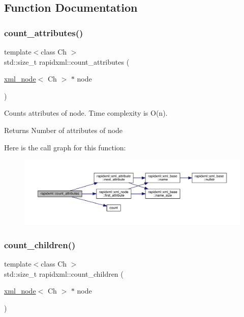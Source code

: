 \subsection{Function Documentation}
\mbox{\label{namespacerapidxml_a6255d15e5d8ad12ebcd7c60da51c97e2}} 
\subsubsection{\texorpdfstring{count\_attributes()}{count\_attributes()}}
{\footnotesize\ttfamily template$<$class Ch $>$ \\
std\+::size\+\_\+t rapidxml\+::count\+\_\+attributes (\begin{DoxyParamCaption}\item[{\mbox{\hyperlink{classrapidxml_1_1xml__node}{xml\+\_\+node}}$<$ Ch $>$ $\ast$}]{node }\end{DoxyParamCaption})\hspace{0.3cm}{\ttfamily [inline]}}

Counts attributes of node. Time complexity is O(n). \begin{DoxyReturn}{Returns}
Number of attributes of node 
\end{DoxyReturn}
Here is the call graph for this function\+:
\nopagebreak
\begin{figure}[H]
\begin{center}
\leavevmode
\includegraphics[width=350pt]{namespacerapidxml_a6255d15e5d8ad12ebcd7c60da51c97e2_cgraph}
\end{center}
\end{figure}
\mbox{\label{namespacerapidxml_a21c1cf2814019385e6b8d09e75af1d34}} 
\subsubsection{\texorpdfstring{count\_children()}{count\_children()}}
{\footnotesize\ttfamily template$<$class Ch $>$ \\
std\+::size\+\_\+t rapidxml\+::count\+\_\+children (\begin{DoxyParamCaption}\item[{\mbox{\hyperlink{classrapidxml_1_1xml__node}{xml\+\_\+node}}$<$ Ch $>$ $\ast$}]{node }\end{DoxyParamCaption})\hspace{0.3cm}{\ttfamily [inline]}}

